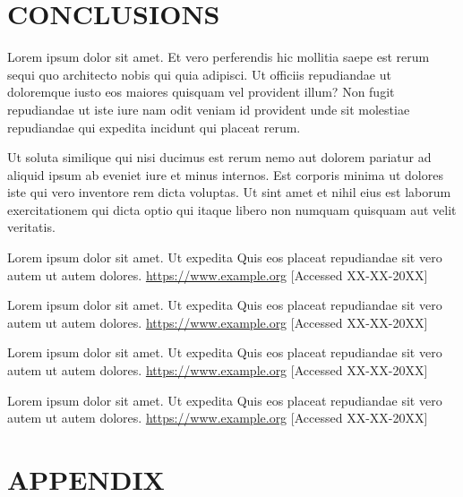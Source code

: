 \documentclass[12pt]{article}
\begin{document}
\section{CONCLUSIONS}

Lorem ipsum dolor sit amet. Et vero perferendis hic mollitia saepe est rerum sequi quo architecto nobis qui quia adipisci. Ut officiis repudiandae ut doloremque iusto eos maiores quisquam vel provident illum? Non fugit repudiandae ut iste iure nam odit veniam id provident unde sit molestiae repudiandae qui expedita incidunt qui placeat rerum.

Ut soluta similique qui nisi ducimus est rerum nemo aut dolorem pariatur ad aliquid ipsum ab eveniet iure et minus internos. Est corporis minima ut dolores iste qui vero inventore rem dicta voluptas. Ut sint amet et nihil eius est laborum exercitationem qui dicta optio qui itaque libero non numquam quisquam aut velit veritatis.

\newpage

\begin{thebibliography}{00}

Lorem ipsum dolor sit amet. Ut expedita Quis eos placeat repudiandae sit vero autem ut autem dolores. 
\url{https://www.example.org}
[Accessed XX-XX-20XX]

Lorem ipsum dolor sit amet. Ut expedita Quis eos placeat repudiandae sit vero autem ut autem dolores. 
\url{https://www.example.org}
[Accessed XX-XX-20XX]

Lorem ipsum dolor sit amet. Ut expedita Quis eos placeat repudiandae sit vero autem ut autem dolores. 
\url{https://www.example.org}
[Accessed XX-XX-20XX]

Lorem ipsum dolor sit amet. Ut expedita Quis eos placeat repudiandae sit vero autem ut autem dolores. 
\url{https://www.example.org}
[Accessed XX-XX-20XX]


\end{thebibliography}
\newpage
\section{APPENDIX}
\end{document}
